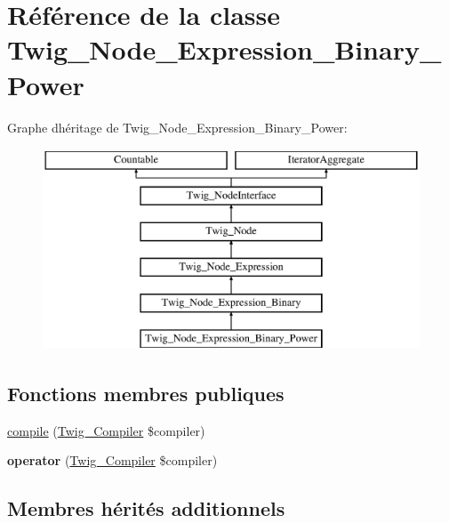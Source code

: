 \hypertarget{class_twig___node___expression___binary___power}{}\section{Référence de la classe Twig\+\_\+\+Node\+\_\+\+Expression\+\_\+\+Binary\+\_\+\+Power}
\label{class_twig___node___expression___binary___power}
Graphe d\textquotesingle{}héritage de Twig\+\_\+\+Node\+\_\+\+Expression\+\_\+\+Binary\+\_\+\+Power\+:\begin{figure}[H]
\begin{center}
\leavevmode
\includegraphics[height=6.000000cm]{class_twig___node___expression___binary___power}
\end{center}
\end{figure}
\subsection*{Fonctions membres publiques}
\begin{DoxyCompactItemize}
\item 
\hyperlink{class_twig___node___expression___binary___power_a4e0faa87c3fae583620b84d3607085da}{compile} (\hyperlink{class_twig___compiler}{Twig\+\_\+\+Compiler} \$compiler)
\item 
{\bfseries operator} (\hyperlink{class_twig___compiler}{Twig\+\_\+\+Compiler} \$compiler)\hypertarget{class_twig___node___expression___binary___power_af77318ec88d5f8a508684970a150b670}{}\label{class_twig___node___expression___binary___power_af77318ec88d5f8a508684970a150b670}

\end{DoxyCompactItemize}
\subsection*{Membres hérités additionnels}


